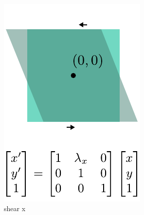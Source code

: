 \begin{figure}[t]
\begin{subfigure}[t]{0.195\linewidth}
        \includegraphics[width=\linewidth]{imgs/shear_x_affine.pdf}
        \caption{\label{fig:shear_x_affine} shear x}
    \end{subfigure}
    \begin{subfigure}[t]{0.195\linewidth}
        \centering

\end{subfigure}
\end{figure}
